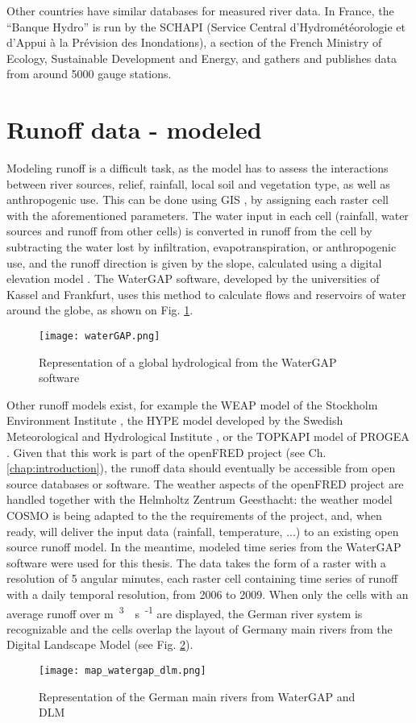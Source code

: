 Other countries have similar databases for measured river data. In France, the ``Banque Hydro'' is run by the SCHAPI (Service Central d'Hydrométéorologie et d'Appui à la Prévision des Inondations), a section of the French Ministry of Ecology, Sustainable Development and Energy, and gathers and publishes data from around 5000 gauge stations.

\section{Runoff data - modeled}

\label{sec:mod_runoff}
Modeling runoff is a difficult task, as the model has to assess the interactions between river sources, relief, rainfall, local soil and vegetation type, as well as anthropogenic use. This can be done using GIS \cite{bayazit}, by assigning each raster cell with the aforementioned parameters. The water input in each cell (rainfall, water sources and runoff from other cells) is converted in runoff from the cell by subtracting the water lost by infiltration, evapotranspiration, or anthropogenic use, and the runoff direction is given by the slope, calculated using a digital elevation model \cite{heywood}. \newline
The WaterGAP software, developed by the universities of Kassel and Frankfurt, uses this method to calculate flows and reservoirs of water around the globe, as shown on Fig. \ref{waterGAP}.
\begin{figure}[H]
\centering
\texttt{[image: waterGAP.png]}
\caption[Representation of a global hydrological from the WaterGAP software]{Representation of a global hydrological from the WaterGAP software \cite{doll}}
\label{waterGAP}
\end{figure}
Other runoff models exist, for example the WEAP model of the Stockholm Environment Institute \cite{weap}, the HYPE model developed by the Swedish Meteorological and Hydrological Institute \cite{hype}, or the TOPKAPI model of PROGEA \cite{topkapi}. \newline
Given that this work is part of the openFRED project (see Ch. \ref{chap:introduction}), the runoff data should eventually be accessible from open source databases or software. The weather aspects of the openFRED project are handled together with the Helmholtz Zentrum Geesthacht: the weather model COSMO is being adapted to the the requirements of the project, and, when ready, will deliver the input data (rainfall, temperature, ...) to an existing open source runoff model. \newline
In the meantime, modeled time series from the WaterGAP software were used for this thesis. The data takes the form of a raster with a resolution of 5 angular minutes, each raster cell containing time series of runoff with a daily temporal resolution, from 2006 to 2009. When only the cells with an average runoff over \unit[100]{m\textsuperscript{3}\textperiodcentered s\textsuperscript{-1}} are displayed, the German river system is recognizable and the cells overlap the layout of Germany main rivers from the Digital Landscape Model \cite{dlm250} (see Fig. \ref{map_watergap_dlm}).

\begin{figure}[H]
\centering
\texttt{[image: map\_watergap\_dlm.png]}
\caption[Representation of the German main rivers from WaterGAP and DLM]{Representation of the German main rivers from WaterGAP and DLM}
\label{map_watergap_dlm}
\end{figure}
